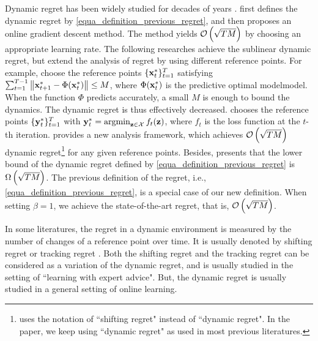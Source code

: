 \documentclass{article}
\begin{document}
Dynamic regret has been widely studied for decades of years \citep{Zinkevich:2003,Hall:2015ct,Hall:2013vr,Jadbabaie:2015wg,Yang:2016ud,Bedi:2018te,Zhang:2016wl,Mokhtari:2016jz,Zhang:2018tu,Gyorgy:2016,NIPS2016_6536,Zhao:2018wx}.   \citet{Zinkevich:2003} first defines the dynamic regret by \eqref{equa_definition_previous_regret}, and then proposes an online gradient descent method. The method yields ${\mathcal{O}\left( \sqrt{TM} \right)}$ by choosing an appropriate learning rate. The following researches achieve the sublinear dynamic regret, but extend the analysis of regret by using different reference points. For example, \citet{Hall:2015ct,Hall:2013vr} choose the reference points $\{{\bf x}_t^{\ast}\}_{t=1}^T$ satisfying $\sum_{t=1}^{T-1} \left\lVert{\bf x}_{t+1}^\ast - \Phi({\bf x}_t^\ast)\right\rVert \le M$, where $\Phi({\bf x}_t^\ast)$ is the predictive optimal modelmodel. When the function $\Phi$ predicts accurately, a small $M$ is enough to bound the dynamics. The dynamic regret is thus effectively decreased. \citet{Jadbabaie:2015wg,Yang:2016ud,Bedi:2018te,Zhang:2016wl,Mokhtari:2016jz,Zhang:2018tu} chooses the reference points $\{{\bf y}_t^{\ast}\}_{t=1}^T$ with $\y_t^{\ast} = \argmin_{\z\in\Xcal} f_t(\z)$, where $f_t$ is the loss function at the $t$-th iteration. \citet{Gyorgy:2016} provides a new analysis framework, which achieves ${\mathcal{O}\left( \sqrt{TM} \right)}$ dynamic regret\footnote{\citet{Gyorgy:2016} uses the notation of ``shifting regret" instead of ``dynamic regret". In the paper, we keep using ``dynamic regret" as used in most previous literatures. } for any given reference points. Besides, \citet{Zhao:2018wx} presents that the lower bound of the dynamic regret defined by \ref{equa_definition_previous_regret} is $\Omega\left( \sqrt{TM} \right)$. The previous definition of the regret, i.e., \eqref{equa_definition_previous_regret}, is a special case of our new definition. When setting $\beta = 1$, we achieve the state-of-the-art regret, that is, ${\mathcal{O}\left( \sqrt{TM} \right)}$. 

In some literatures, the regret in a dynamic environment is measured by the number of changes of a reference point over time. It is usually denoted by shifting regret or tracking regret \citep{Herbster1998,Gyorgy:2005wo,Gyorgy:2012wa,Gyorgy:2016,Mourtada:2017vn,JMLR:v17:13-533,NIPS2016_6536,cesabianchi:hal,pmlr-v84-mohri18a,pmlr-v54-jun17a}. Both the shifting regret and the tracking regret can be considered as a variation of the dynamic regret, and is usually studied in the setting of ``learning with expert advice". But, the dynamic regret is usually studied in a general setting of online learning.
\end{document}
